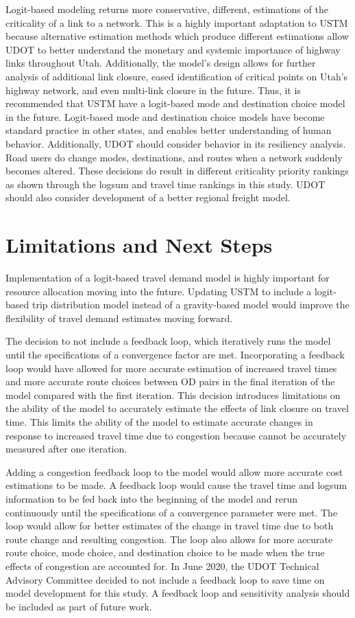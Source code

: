 Logit-based modeling returns more conservative, different,
estimations of the criticality of a link to a network. This is a highly
important adaptation to USTM because alternative estimation methods which produce
different estimations allow
UDOT to better understand the monetary and systemic importance of highway links
throughout Utah. Additionally, the model’s design allows for further
analysis of additional link closure, eased identification of critical
points on Utah's highway network, and even multi-link closure in the
future. Thus, it is recommended that USTM have a logit-based mode and destination
choice model in the future. Logit-based mode and destination choice models have
become standard practice in other states, and enables better understanding of
human behavior. Additionally, UDOT should consider behavior in its resiliency
analysis. Road users do change modes, destinations, and routes when a network
suddenly becomes altered. These decisions do result in different criticality
priority rankings as shown through the logsum and travel time rankings in this study.
UDOT should also consider development of a better regional freight model.

\section{Limitations and Next Steps}

Implementation of a logit-based travel demand model is highly important for
resource allocation moving into the future. Updating USTM to include a
logit-based trip distribution model instead of a gravity-based model would
improve the flexibility of travel demand estimates moving forward.

The decision to not include a feedback loop, which iteratively runs the model
until the specifications of a convergence factor are met. Incorporating a
feedback loop would have allowed for more accurate estimation of increased
travel times and more accurate route choices between OD pairs in the final
iteration of the model compared with the first iteration.
This decision introduces limitations on the
ability of the model to accurately estimate the effects of link closure on
travel time. This limits the ability of the model to estimate accurate changes in
response to increased travel time due to congestion because cannot be
accurately measured after one iteration.

Adding a congestion feedback loop to the model would allow more
accurate cost estimations to be made. A feedback loop would cause the
travel time and logsum information to be fed back into the beginning of the
model and rerun continuously until the specifications of a convergence
parameter were met. The loop would allow for better estimates of the change
in travel time due to both route change and resulting congestion. The loop
also allows for more accurate route choice, mode choice, and destination
choice to be made when the true effects of congestion are accounted for.
In June 2020, the UDOT Technical Advisory Committee decided to not include a
feedback loop to save time
on model development for this study. A feedback loop and sensitivity analysis
should be included as part of future work.

